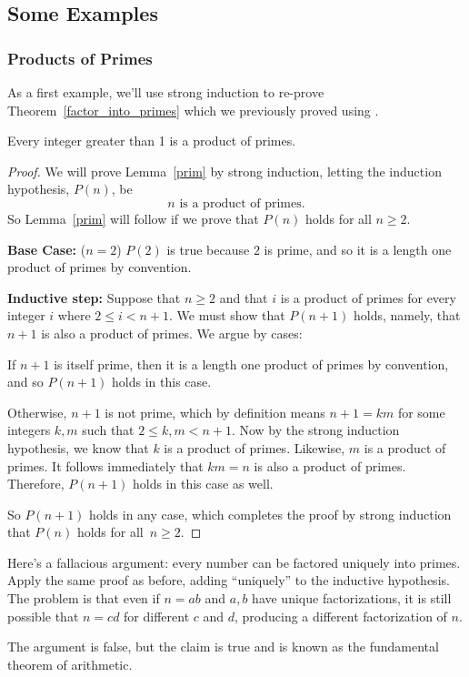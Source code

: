 \subsection{Some Examples}

\subsubsection{Products of Primes}

As a first example, we'll use strong induction to re-prove
Theorem~\ref{factor_into_primes} which we previously proved using .

\begin{lemma}\label{prim}
Every integer greater than 1 is a product of primes.
\end{lemma}

\begin{proof}

We will prove Lemma~\ref{prim} by strong induction, letting the induction
hypothesis, $P(n)$, be
\[
n \text{ is a product of primes}.
\]
So Lemma~\ref{prim} will follow if we prove that $P(n)$ holds for all $n
\geq 2$.

\textbf{Base Case:} ($n=2$) $P(2)$ is true because $2$ is prime, and so it is
a length one product of primes by convention.

\textbf{Inductive step:} Suppose that $n \geq 2$ and that $i$ is a product
of primes for every integer $i$ where $2 \leq i < n+1$.  We must show that
$P(n+1)$ holds, namely, that $n+1$ is also a product of primes.  We argue
by cases:

If $n+1$ is itself prime, then it is a length one product of primes by
convention, and so $P(n+1)$ holds in this case.

Otherwise, $n + 1$ is not prime, which by definition means $n+1 = km$ for
some integers $k,m$ such that $2 \leq k,m < n+1$.  Now by the strong induction
hypothesis, we know that $k$ is a product of primes.  Likewise,
$m$ is a product of primes.  It follows immediately that $km = n$ is
also a product of primes.  Therefore, $P(n+1)$ holds in this case as well.

So $P(n+1)$ holds in any case, which completes the proof by strong
induction that $P(n)$ holds for all~$n \ge 2$.

\end{proof}

\begin{editingnotes}
Here's a fallacious argument: every number can be factored uniquely
into primes.  Apply the same proof as before, adding ``uniquely'' to
the inductive hypothesis.  The problem is that even if $n=ab$ and
$a,b$ have unique factorizations, it is still possible that $n=cd$ for
different $c$ and $d$, producing a different factorization of $n$.

The argument is false, but the claim is true and is known as the
fundamental theorem of arithmetic.

\end{editingnotes}

